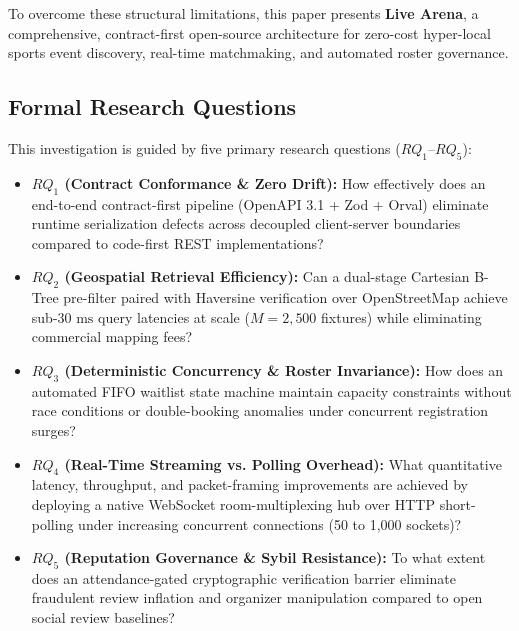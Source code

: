 \documentclass[conference]{IEEEtran}
\begin{document}
To overcome these structural limitations, this paper presents \textbf{Live Arena}, a comprehensive, contract-first open-source architecture for zero-cost hyper-local sports event discovery, real-time matchmaking, and automated roster governance.

\subsection{Formal Research Questions}
This investigation is guided by five primary research questions ($RQ_1$--$RQ_5$):
\begin{itemize}
    \item \textbf{$RQ_1$ (Contract Conformance \& Zero Drift):} How effectively does an end-to-end contract-first pipeline (OpenAPI 3.1 + Zod + Orval) eliminate runtime serialization defects across decoupled client-server boundaries compared to code-first REST implementations?
    \item \textbf{$RQ_2$ (Geospatial Retrieval Efficiency):} Can a dual-stage Cartesian B-Tree pre-filter paired with Haversine verification over OpenStreetMap achieve sub-$30\text{ ms}$ query latencies at scale ($M = 2,500$ fixtures) while eliminating commercial mapping fees?
    \item \textbf{$RQ_3$ (Deterministic Concurrency \& Roster Invariance):} How does an automated FIFO waitlist state machine maintain capacity constraints without race conditions or double-booking anomalies under concurrent registration surges?
    \item \textbf{$RQ_4$ (Real-Time Streaming vs. Polling Overhead):} What quantitative latency, throughput, and packet-framing improvements are achieved by deploying a native WebSocket room-multiplexing hub over HTTP short-polling under increasing concurrent connections (50 to 1,000 sockets)?
    \item \textbf{$RQ_5$ (Reputation Governance \& Sybil Resistance):} To what extent does an attendance-gated cryptographic verification barrier eliminate fraudulent review inflation and organizer manipulation compared to open social review baselines?
\end{itemize}
\end{document}
